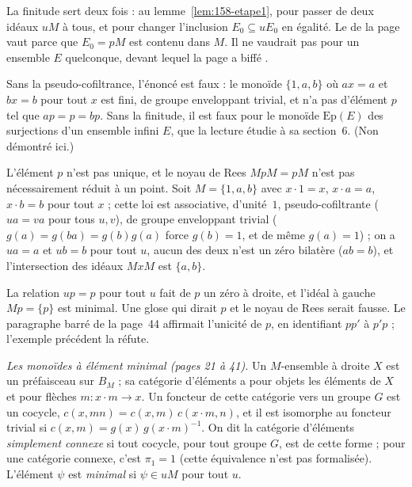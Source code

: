 \begin{remarque}
La finitude sert deux fois : au lemme~\ref{lem:158-etape1}, pour passer de deux idéaux $uM$ à tous, et pour changer l'inclusion $E_0 \subseteq uE_0$ en égalité. Le  de la page vaut parce que $E_0 = pM$ est contenu dans $M$. Il ne vaudrait pas pour un ensemble $E$ quelconque, devant lequel la page a biffé .
\end{remarque}

\begin{remarque}
Sans la pseudo-cofiltrance, l'énoncé est faux : le monoïde $\{1, a, b\}$ où $ax = a$ et $bx = b$ pour tout $x$ est fini, de groupe enveloppant trivial, et n'a pas d'élément $p$ tel que $ap = p = bp$. Sans la finitude, il est faux pour le monoïde $\mathrm{Ep}(E)$ des surjections d'un ensemble infini $E$, que la lecture étudie à sa section~6. (Non démontré ici.)
\end{remarque}

\begin{remarque}
L'élément $p$ n'est pas unique, et le noyau de Rees $MpM = pM$ n'est pas nécessairement réduit à un point. Soit $M = \{1, a, b\}$ avec $x \cdot 1 = x$, $x \cdot a = a$, $x \cdot b = b$ pour tout $x$ ; cette loi est associative, d'unité~$1$, pseudo-cofiltrante ($ua = va$ pour tous $u, v$), de groupe enveloppant trivial ($g(a) = g(ba) = g(b)g(a)$ force $g(b) = 1$, et de même $g(a) = 1$) ; on a $ua = a$ et $ub = b$ pour tout $u$, aucun des deux n'est un zéro bilatère ($ab = b$), et l'intersection des idéaux $MxM$ est $\{a, b\}$.
\end{remarque}

\begin{remarque}
La relation $up = p$ pour tout $u$ fait de $p$ un zéro à droite, et l'idéal à gauche $Mp = \{p\}$ est minimal. Une glose qui dirait $p$  et le noyau de Rees  serait fausse. Le paragraphe barré de la page~44 affirmait l'unicité de $p$, en identifiant $pp'$ à $p'p$ ; l'exemple précédent la réfute.
\end{remarque}

\noindent\emph{Les monoïdes à élément minimal (pages 21 à 41).} Un $M$-ensemble à droite $X$ est un préfaisceau sur $B_M$ ; sa catégorie d'éléments a pour objets les éléments de $X$ et pour flèches $m : x\cdot m \to x$. Un foncteur de cette catégorie vers un groupe $G$ est un cocycle, $c(x, mn) = c(x, m)\,c(x\cdot m, n)$, et il est isomorphe au foncteur trivial si $c(x, m) = g(x)\,g(x\cdot m)^{-1}$. On dit la catégorie d'éléments \emph{simplement connexe} si tout cocycle, pour tout groupe $G$, est de cette forme ; pour une catégorie connexe, c'est $\pi_1 = 1$ (cette équivalence n'est pas formalisée). L'élément $\psi$ est \emph{minimal} si $\psi \in uM$ pour tout $u$.

